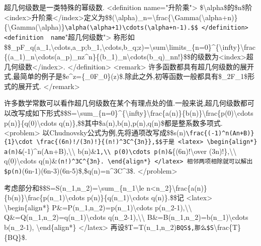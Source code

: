 \documentclass[
]{article}
\begin{document}
超几何级数是一类特殊的幂级数. \textless definition
name="升阶乘"\textgreater{}
\$\textbackslash alpha\$的\$n\$阶\textless index\textgreater 升阶乘\textless/index\textgreater 定义为\$\$(\textbackslash alpha)\_n=\textbackslash frac\{\textbackslash Gamma(\textbackslash alpha+n)\}\{\textbackslash Gamma(\textbackslash alpha)\}\texttt{\textbackslash{}alpha(\textbackslash{}alpha+1)\textbackslash{}cdots(\textbackslash{}alpha+n-1).\$\$
\textless{}/definition\textgreater{}
\textless{}definition\ \ name}"超几何级数"\textgreater{}
称形如\$\$\_pF\_q(a\_1,\textbackslash cdots,a\_p;b\_1,\textbackslash cdots,b\_q;z)=\textbackslash sum\textbackslash limits\_\{n=0\}\^{}\{\textbackslash infty\}\textbackslash frac\{(a\_1)\_n\textbackslash cdots(a\_p)\_nz\^{}n\}\{(b\_1)\_n\textbackslash cdots(b\_q)\_nn!\}\$\$的级数为\textless index\textgreater 超几何级数\textless/index\textgreater.
\textless/definition\textgreater{} \textless remark\textgreater{}
许多函数都具有超几何级数的展开式,最简单的例子是\$e\^{}z=\{\_0F\_0\}(z)\$.除此之外,初等函数一般都具有\$\_2F\_1\$形式的展开式.
\textless/remark\textgreater{}

许多数学常数可以看作超几何级数在某个有理点处的值.一般来说,超几何级数都可以改写成如下形式\$\$S=\textbackslash sum\_\{n=0\}\^{}\{\textbackslash infty\}\textbackslash frac\{a(n)\}\{b(n)\}\textbackslash frac\{p(0)\textbackslash cdots
p(n)\}\{q(0)\textbackslash cdots
q(n)\},\$\$其中\$a(n),b(n),p(n),q(n)\$都是整系数多项式.
\textless problem\textgreater{}
以Chudnovsky公式为例,先将通项改写成\$\$s(n)\texttt{\textbackslash{}frac\{(-1)\^{}n(An+B)\}\{1\}\textbackslash{}cdot\ \textbackslash{}frac\{(6n)!/(3n)!\}\{(n!)\^{}3C\^{}\{3n\}\},\$\$于是
\textless{}latex\textgreater{}
\textbackslash{}begin\{align*\}
a(n)\&}(-1)\^{}n(An+B),\textbackslash\textbackslash{}
b(n)\&\texttt{1,\textbackslash{}\textbackslash{}
p(0)\textbackslash{}cdots\ p(n)\&}\{(6n)!\textbackslash over
(3n)!\},\textbackslash\textbackslash{} q(0)\textbackslash cdots
q(n)\&\texttt{(n!)\^{}3C\^{}\{3n\}.
\textbackslash{}end\{align*\}
\textless{}/latex\textgreater{}
相邻两项相除就可以解出\$p(n)}(6n-1)(6n-3)(6n-5)\$,\$q(n)=n\^{}3C\^{}3\$.
\textless/problem\textgreater{}

考虑部分和\$\$S=S(n\_1,n\_2)=\textbackslash sum\_\{n\_1\textbackslash le
n\textless n\_2\}\textbackslash frac\{a(n)\}\{b(n)\}\textbackslash frac\{p(n\_1)\textbackslash cdots
p(n)\}\{q(n\_1)\textbackslash cdots q(n)\}.\$\$记
\textless latex\textgreater{} \textbackslash begin\{align*\}
P\&=P(n\_1,n\_2)=p(n\_1)\textbackslash cdots
p(n\_2-1),\textbackslash\textbackslash{}
Q\&=Q(n\_1,n\_2)=q(n\_1)\textbackslash cdots
q(n\_2-1),\textbackslash\textbackslash{}
B\&=B(n\_1,n\_2)=b(n\_1)\textbackslash cdots b(n\_2-1),
\textbackslash end\{align*\} \textless/latex\textgreater{}
再设\$T=T(n\_1,n\_2)\texttt{BQS\$,那么\$S}\textbackslash frac\{T\}\{BQ\}\$.
\end{document}
